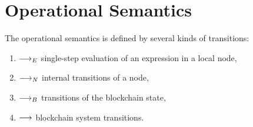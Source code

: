\documentclass[runningheads]{llncs}
\begin{document}
\section{Operational Semantics}
\label{sec:transitions}

The operational semantics is defined by several kinds of transitions:
\begin{enumerate}
\item $\stackrel{{}}\longrightarrow_E$ single-step evaluation of an expression in a local node,
\item $\stackrel{{}}\longrightarrow_N$ internal transitions of a node,
\item $\stackrel{{}}\longrightarrow_B$ transitions of the blockchain state,
\item $\longrightarrow$ blockchain system transitions.
\end{enumerate}
\end{document}
